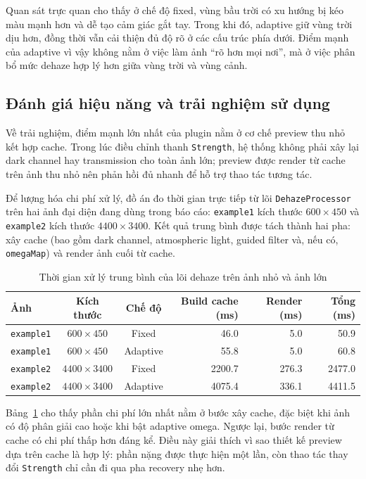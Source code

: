 Quan sát trực quan cho thấy ở chế độ fixed, vùng bầu trời có xu hướng bị kéo màu mạnh hơn và dễ tạo cảm giác gắt tay. Trong khi đó, adaptive giữ vùng trời dịu hơn, đồng thời vẫn cải thiện đủ độ rõ ở các cấu trúc phía dưới. Điểm mạnh của adaptive vì vậy không nằm ở việc làm ảnh “rõ hơn mọi nơi”, mà ở việc phân bổ mức dehaze hợp lý hơn giữa vùng trời và vùng cảnh.

\subsection{Đánh giá hiệu năng và trải nghiệm sử dụng}

Về trải nghiệm, điểm mạnh lớn nhất của plugin nằm ở cơ chế preview thu nhỏ kết hợp cache. Trong lúc điều chỉnh thanh \texttt{Strength}, hệ thống không phải xây lại dark channel hay transmission cho toàn ảnh lớn; preview được render từ cache trên ảnh thu nhỏ nên phản hồi đủ nhanh để hỗ trợ thao tác tương tác.

Để lượng hóa chi phí xử lý, đồ án đo thời gian trực tiếp từ lõi \texttt{DehazeProcessor} trên hai ảnh đại diện đang dùng trong báo cáo: \texttt{example1} kích thước \(600 \times 450\) và \texttt{example2} kích thước \(4400 \times 3400\). Kết quả trung bình được tách thành hai pha: xây cache (bao gồm dark channel, atmospheric light, guided filter và, nếu có, \texttt{omegaMap}) và render ảnh cuối từ cache.

\begin{table}[H]
  \centering
  \small
  \begin{tabular}{lccrrr}
    \toprule
    Ảnh & Kích thước & Chế độ & Build cache (ms) & Render (ms) & Tổng (ms) \\
    \midrule
    \texttt{example1} & \(600 \times 450\) & Fixed & 46.0 & 5.0 & 50.9 \\
    \texttt{example1} & \(600 \times 450\) & Adaptive & 55.8 & 5.0 & 60.8 \\
    \texttt{example2} & \(4400 \times 3400\) & Fixed & 2200.7 & 276.3 & 2477.0 \\
    \texttt{example2} & \(4400 \times 3400\) & Adaptive & 4075.4 & 336.1 & 4411.5 \\
    \bottomrule
  \end{tabular}
  \caption{Thời gian xử lý trung bình của lõi dehaze trên ảnh nhỏ và ảnh lớn}
  \label{tab:runtime}
\end{table}

Bảng~\ref{tab:runtime} cho thấy phần chi phí lớn nhất nằm ở bước xây cache, đặc biệt khi ảnh có độ phân giải cao hoặc khi bật adaptive omega. Ngược lại, bước render từ cache có chi phí thấp hơn đáng kể. Điều này giải thích vì sao thiết kế preview dựa trên cache là hợp lý: phần nặng được thực hiện một lần, còn thao tác thay đổi \texttt{Strength} chỉ cần đi qua pha recovery nhẹ hơn.

